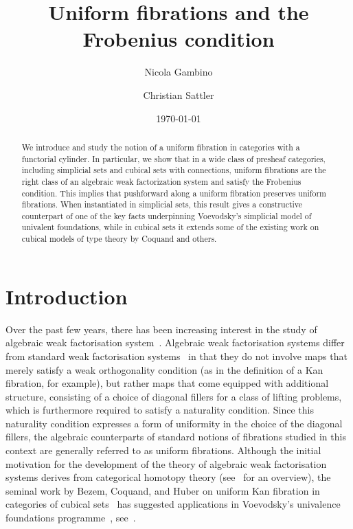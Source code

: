 \documentclass[reqno,10pt,a4paper,oneside,draft]{amsart}
\title{Uniform fibrations and the Frobenius condition}
\begin{document}
\begin{abstract}
We introduce and study the notion of a uniform fibration in categories with a functorial cylinder.
In particular, we show that in a wide class of presheaf categories, including simplicial sets and cubical sets with connections, uniform fibrations are the right class of an algebraic weak factorization system and satisfy the Frobenius condition.
This implies that pushforward along a uniform fibration preserves uniform fibrations.
When instantiated in simplicial sets, this result gives a constructive counterpart of one of the key facts underpinning Voevodsky's simplicial model of univalent foundations, while in cubical sets it extends some of the existing work on cubical models of type theory by Coquand and others.
\end{abstract}

\author{Nicola Gambino}
\address{School of Mathematics, University of Leeds, Leeds LS2 9JT, UK}

\author{Christian Sattler}
\address{School of Mathematics, University of Leeds, Leeds LS2 9JT, UK}

\date{\today}

\maketitle


\section*{Introduction}

Over the past few years, there has been increasing interest in the study of algebraic  weak factorisation system~\cite{bourke-garner-I,bourke-garner-II,garner:small-object-argument,grandis-tholen-nwfs}. Algebraic weak factorisation systems
differ from standard weak factorisation systems~\cite{bousfield-wfs} 
in that they do not involve maps that merely satisfy a weak orthogonality condition
(as in the definition of a Kan fibration, for example), but rather maps that come equipped with 
additional structure, consisting of a choice of diagonal fillers for a class of lifting problems, which is furthermore required to satisfy a naturality condition. Since this naturality condition expresses a form
of uniformity in the choice of the diagonal fillers, the algebraic
counterparts of standard notions of fibrations studied in this context are generally referred to as uniform fibrations.  Although the initial
motivation for the development of the theory of algebraic weak factorisation
systems derives from categorical homotopy 
theory (see~\cite{riehl-cat-homotopy} for an overview), 
 the seminal work by  Bezem, Coquand, and Huber on uniform Kan fibration in categories of cubical sets~\cite{coquand-cubical-sets} has suggested applications  in Voevodsky's univalence foundations programme~\cite{voevodsky:uf}, see~\cite{awodey-cubical,cohen-et-al:cubicaltt,pitts-cubical-nominal,swan-awfs}. 
\end{document}
